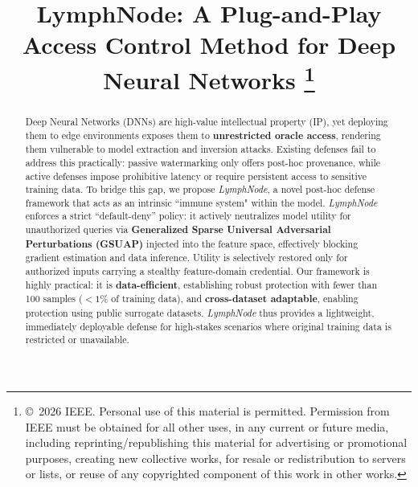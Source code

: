 \documentclass[conference]{IEEEtran}
\begin{document}

\title{LymphNode: A Plug-and-Play Access Control Method for Deep Neural Networks%
\thanks{\copyright~2026 IEEE. Personal use of this material is permitted. 
Permission from IEEE must be obtained for all other uses, in any current or 
future media, including reprinting/republishing this material for advertising 
or promotional purposes, creating new collective works, for resale or 
redistribution to servers or lists, or reuse of any copyrighted component of 
this work in other works.}
}

\author{
\and
{}
\and
{}
}

\maketitle

\begin{abstract}
Deep Neural Networks (DNNs) are high-value intellectual property (IP), yet deploying them to edge environments exposes them to \textbf{unrestricted oracle access}, rendering them vulnerable to model extraction and inversion attacks. Existing defenses fail to address this practically: passive watermarking only offers post-hoc provenance, while active defenses impose prohibitive latency or require persistent access to sensitive training data. To bridge this gap, we propose \textit{LymphNode}, a novel post-hoc defense framework that acts as an intrinsic ``immune system" within the model. \textit{LymphNode} enforces a strict ``default-deny'' policy: it actively neutralizes model utility for unauthorized queries via \textbf{Generalized Sparse Universal Adversarial Perturbations (GSUAP)} injected into the feature space, effectively blocking gradient estimation and data inference. Utility is selectively restored only for authorized inputs carrying a stealthy feature-domain credential. Our framework is highly practical: it is \textbf{data-efficient}, establishing robust protection with fewer than 100 samples ($<1\%$ of training data), and \textbf{cross-dataset adaptable}, enabling protection using public surrogate datasets. \textit{LymphNode} thus provides a lightweight, immediately deployable defense for high-stakes scenarios where original training data is restricted or unavailable.
\end{abstract}
\end{document}
